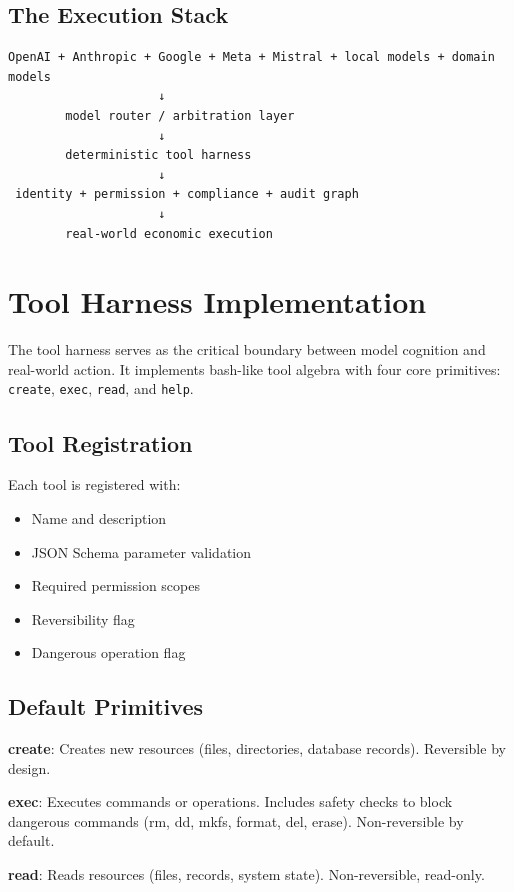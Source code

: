 \documentclass[11pt,a4paper]{article}
\begin{document}
\subsection{The Execution Stack}

\begin{verbatim}
OpenAI + Anthropic + Google + Meta + Mistral + local models + domain models
                     ↓
        model router / arbitration layer
                     ↓
        deterministic tool harness
                     ↓
 identity + permission + compliance + audit graph
                     ↓
        real-world economic execution
\end{verbatim}

\section{Tool Harness Implementation}

The tool harness serves as the critical boundary between model cognition and real-world action. It implements bash-like tool algebra with four core primitives: \texttt{create}, \texttt{exec}, \texttt{read}, and \texttt{help}.

\subsection{Tool Registration}

Each tool is registered with:
\begin{itemize}
    \item Name and description
    \item JSON Schema parameter validation
    \item Required permission scopes
    \item Reversibility flag
    \item Dangerous operation flag
\end{itemize}

\subsection{Default Primitives}

\textbf{create}: Creates new resources (files, directories, database records). Reversible by design.

\textbf{exec}: Executes commands or operations. Includes safety checks to block dangerous commands (rm, dd, mkfs, format, del, erase). Non-reversible by default.

\textbf{read}: Reads resources (files, records, system state). Non-reversible, read-only.
\end{document}
